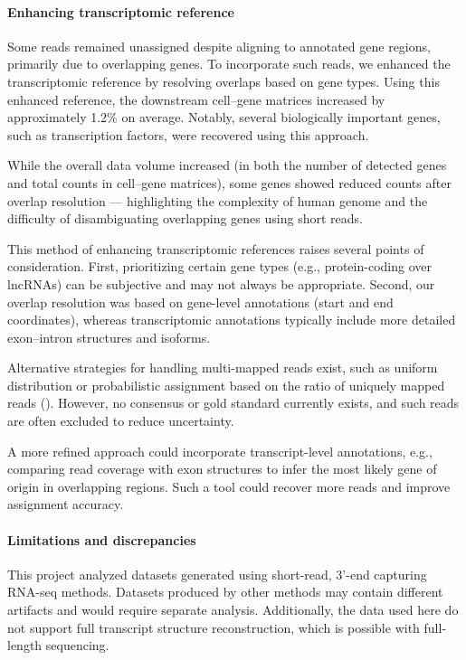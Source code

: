 \paragraph{Enhancing transcriptomic reference}

Some reads remained unassigned despite aligning to annotated gene regions, primarily due to overlapping genes.
To incorporate such reads, we enhanced the transcriptomic reference by resolving overlaps based on gene types.
Using this enhanced reference, the downstream cell–gene matrices increased by approximately 1.2\% on average.
Notably, several biologically important genes, such as transcription factors, were recovered using this approach.

While the overall data volume increased (in both the number of detected genes and total counts in cell–gene matrices),
some genes showed reduced counts after overlap resolution —
highlighting the complexity of human genome and the difficulty of disambiguating overlapping genes using short reads.

This method of enhancing transcriptomic references raises several points of consideration.
First, prioritizing certain gene types (e.g., protein-coding over lncRNAs) can be subjective and may not always be appropriate.
Second, our overlap resolution was based on gene-level annotations (start and end coordinates),
whereas transcriptomic annotations typically include more detailed exon–intron structures and isoforms.

Alternative strategies for handling multi-mapped reads exist,
such as uniform distribution or probabilistic assignment based on the ratio of uniquely mapped reads (\cite{Francoeur2020}).
However, no consensus or gold standard currently exists, and such reads are often excluded to reduce uncertainty.

A more refined approach could incorporate transcript-level annotations,
e.g., comparing read coverage with exon structures to infer the most likely gene of origin in overlapping regions.
Such a tool could recover more reads and improve assignment accuracy.

\paragraph{Limitations and discrepancies}

This project analyzed datasets generated using short-read, 3'-end capturing RNA-seq methods.
Datasets produced by other methods may contain different artifacts and would require separate analysis.
Additionally, the data used here do not support full transcript structure reconstruction,
which is possible with full-length sequencing.

